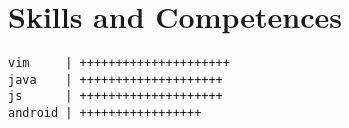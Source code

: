 \section*{Skills and Competences}
\begin{verbatim}
vim     | +++++++++++++++++++++
java    | ++++++++++++++++++++
js      | ++++++++++++++++++++
android | +++++++++++++++++
\end{verbatim}